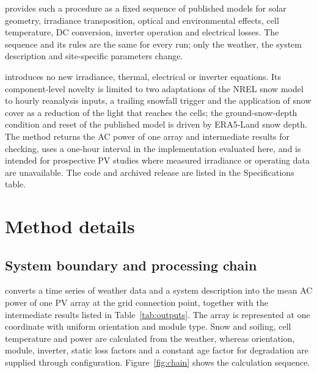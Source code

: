 \documentclass[11pt]{article}
\begin{document}
\RePV{} provides such a procedure as a fixed sequence of published models for solar geometry, irradiance transposition, optical and environmental effects, cell temperature, DC conversion, inverter operation and electrical losses. The sequence and its rules are the same for every run; only the weather, the system description and site-specific parameters change.

\RePV{} introduces no new irradiance, thermal, electrical or inverter equations. Its component-level novelty is limited to two adaptations of the NREL snow model to hourly reanalysis inputs, a trailing snowfall trigger and the application of snow cover as a reduction of the light that reaches the cells; the ground-snow-depth condition and reset of the published model is driven by ERA5-Land snow depth. The method returns the AC power of one array and intermediate results for checking, uses a one-hour interval in the implementation evaluated here, and is intended for prospective PV studies where measured irradiance or operating data are unavailable. The code and archived release are listed in the Specifications table.

\section{Method details}
\label{sec:method}

\subsection{System boundary and processing chain}
\label{sec:overview}

\RePV{} converts a time series of weather data and a system description into the mean AC power of one PV array at the grid connection point, together with the intermediate results listed in Table~\ref{tab:outputs}. The array is represented at one coordinate with uniform orientation and module type. Snow and soiling, cell temperature and power are calculated from the weather, whereas orientation, module, inverter, static loss factors and a constant age factor for degradation are supplied through configuration. Figure~\ref{fig:chain} shows the calculation sequence.
\end{document}
